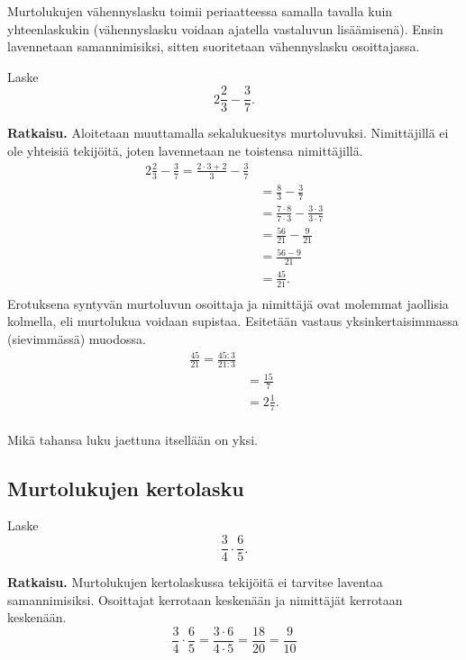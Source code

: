 Murtolukujen vähennyslasku toimii periaatteessa samalla tavalla kuin yhteenlaskukin (vähennyslasku voidaan ajatella vastaluvun lisäämisenä). Ensin lavennetaan samannimisiksi, sitten suoritetaan vähennyslasku osoittajassa.

\begin{esimerkki}
        Laske
        \[
        2\frac{2}{3} - \frac{3}{7}.
        \]
        
        \textbf{Ratkaisu.}
        Aloitetaan muuttamalla sekalukuesitys murtoluvuksi. Nimittäjillä ei ole yhteisiä tekijöitä, joten lavennetaan ne toistensa nimittäjillä. %
        \begin{align*}
            2\frac{2}{3} - \frac{3}{7} = \frac{2\cdot3+2}{3} - \frac{3}{7} \\
            			&=\frac{8}{3} - \frac{3}{7}\\
            			&=\frac{7\cdot8}{7\cdot3} - \frac{3\cdot3}{3\cdot7}\\
            			&=\frac{56}{21} - \frac{9}{21}\\
            			&=\frac{56-9}{21}\\
            			&=\frac{45}{21}.\\
        \end{align*}
        Erotuksena syntyvän murtoluvun osoittaja ja nimittäjä ovat molemmat jaollisia kolmella, eli murtolukua voidaan supistaa. 
        Esitetään vastaus yksinkertaisimmassa (sievimmässä) muodossa.
        \begin{align*}
            \frac{45}{21} = \frac{45:3}{21:3}\\
		  &=\frac{15}{7}\\
		  &=2\frac{1}{7}.\\
        \end{align*}
    \end{esimerkki}

Mikä tahansa luku jaettuna itsellään on yksi.
    
\subsection*{Murtolukujen kertolasku}
    
\begin{esimerkki}
	Laske
	\[
        \frac{3}{4}\cdot \frac{6}{5}.
        \]
	
        \textbf{Ratkaisu.}
        Murtolukujen kertolaskussa tekijöitä ei tarvitse laventaa samannimisiksi. 
        Osoittajat kerrotaan keskenään ja nimittäjät kerrotaan keskenään. 
      \[
        \frac{3}{4}\cdot \frac{6}{5}= \frac{3\cdot 6}{4\cdot 5}= \frac{18}{20}=\frac{9}{10}
        \]
    \end{esimerkki}
    
